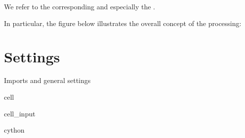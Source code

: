 \documentclass[letterpaper,10pt,english]{jupyterBook}
\begin{document}
\sphinxAtStartPar
We refer to the corresponding  and especially the .

\sphinxAtStartPar
In particular, the figure below illustrates the overall concept of the processing:



\section{Settings}
\label{\detokenize{CIMR_L2_Sea_Ice_Drift_algorithm:settings}}
\sphinxAtStartPar
Imports and general settings

\begin{sphinxuseclass}{cell}\begin{sphinxVerbatimInput}

\begin{sphinxuseclass}{cell_input}
\begin{sphinxVerbatim}[commandchars=\\\{\}]
 cython
\end{sphinxVerbatim}

\end{sphinxuseclass}\end{sphinxVerbatimInput}

\end{sphinxuseclass}
\end{document}
